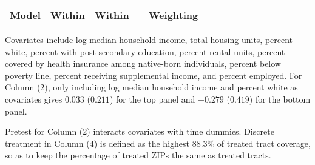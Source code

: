 \begin{table}[tbh]
\begin{threeparttable}
\begin{tabular}{lcccccc}
\quad Model                      &                                                  Within &                                                  Within &                                                         &                                               Weighting &                                                         &                                                         \\
\bottomrule
\end{tabular}

        \begin{tablenotes}
        \footnotesize
        \item     Covariates include log median household income, total housing units, percent white,
    percent with post-secondary education,
    percent rental units, percent covered by health insurance among native-born individuals,
    percent below poverty line, percent receiving supplemental income, and percent employed.
    For Column (2), only including log median household income and
percent white as covariates gives $0.033$ ($0.211$) for the top panel and
$-0.279$ ($0.419$) for the bottom panel.

    Pretest for Column (2) interacts covariates with time dummies.
    Discrete treatment in Column (4) is defined as
    the highest 88.3\% of treated
    tract coverage, so as to keep the percentage of treated ZIPs the same as treated tracts.
    
        \end{tablenotes}
        \end{threeparttable}

        \end{table}
        